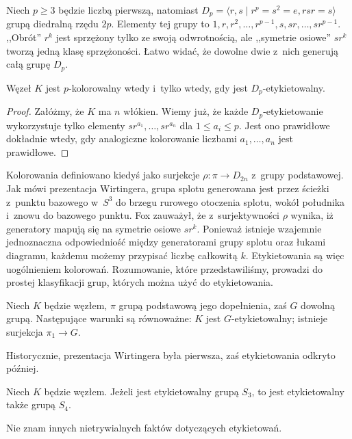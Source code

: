 Niech $p \ge 3$ będzie liczbą pierwszą, natomiast $D_p = \langle r, s \mid r^p = s^2 = e, rsr = s \rangle$ grupą diedralną rzędu $2p$.
Elementy tej grupy to $1, r, r^2, \ldots, r^{p-1}, s, sr, \ldots, sr^{p-1}$.
,,Obrót'' $r^k$ jest sprzężony tylko ze swoją odwrotnością, ale ,,symetrie osiowe'' $sr^k$ tworzą jedną klasę sprzężoności.
Łatwo widać, że dowolne dwie z~nich generują całą grupę $D_p$.

\begin{proposition}
    Węzeł $K$ jest $p$-kolorowalny wtedy i~tylko wtedy, gdy jest $D_p$-etykietowalny.
\end{proposition}

\begin{proof}
    Załóżmy, że $K$ ma $n$ włókien.
    Wiemy już, że każde $D_p$-etykietowanie wykorzystuje tylko elementy $sr^{a_1}, \ldots, sr^{a_n}$ dla $1 \le a_i \le p$.
    Jest ono prawidłowe dokładnie wtedy, gdy analogiczne kolorowanie liczbami $a_1, \ldots, a_n$ jest prawidłowe.
\end{proof}

Kolorowania definiowano kiedyś jako surjekcje $\rho \colon \pi \to D_{2n}$ z~grupy podstawowej.
Jak mówi prezentacja Wirtingera, grupa splotu generowana jest przez ścieżki z~punktu bazowego w~$S^3$ do brzegu rurowego otoczenia splotu, wokół południka i~znowu do bazowego punktu.
%
Fox zauważył, że z~surjektywności $\rho$ wynika, iż generatory mapują się na symetrie osiowe $sr^k$.
Ponieważ istnieje wzajemnie jednoznaczna odpowiedniość między generatorami grupy splotu oraz łukami diagramu, każdemu możemy przypisać liczbę całkowitą $k$.
Etykietowania są więc uogólnieniem kolorowań.
Rozumowanie, które przedstawiliśmy, prowadzi do prostej klasyfikacji grup, których można użyć do etykietowania.

\begin{proposition}
    Niech $K$ będzie węzłem, $\pi$ grupą podstawową jego dopełnienia, zaś $G$ dowolną grupą.
    Następujące warunki są równoważne: $K$ jest $G$-etykietowalny; istnieje surjekcja $\pi_1 \to G$.
\end{proposition}

Historycznie, prezentacja Wirtingera była pierwsza, zaś etykietowania odkryto później.

\begin{proposition}[Perko]
    Niech $K$ będzie węzłem.
    Jeżeli jest etykietowalny grupą $S_3$, to jest etykietowalny także grupą $S_4$.
\end{proposition}

Nie znam innych nietrywialnych faktów dotyczących etykietowań.




